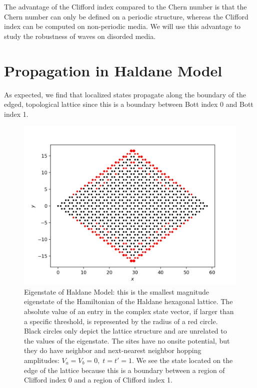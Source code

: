 \documentclass[a4paper]{article}
\begin{document}
The advantage of the Clifford index compared to the Chern number is that the Chern number can only be defined on a periodic structure, whereas the Clifford index can be computed on non-periodic media.
We will use this advantage to study the robustness of waves on disorded media.

\section{Propagation in Haldane Model}
As expected, we find that localized states propagate along the boundary of the edged, topological lattice since this is a boundary between Bott index 0 and Bott index 1.

\begin{figure}
\centering
\includegraphics[width=.5\textwidth]{figures/haldane_estate.png}
\caption{Eigenstate of Haldane Model: this is the smallest magnitude eigenstate of the Hamiltonian of the Haldane hexagonal lattice.
The absolute value of an entry in the complex state vector, if larger than a specific threshold, is represented by the radius of a red circle.
Black circles only depict the lattice structure and are unrelated to the values of the eigenstate.
The sites have no onsite potential, but they do have neighbor and next-nearest neighbor hopping amplitudes: $V_a = V_b = 0,\; t = t' = 1$.
We see the state located on the edge of the lattice because this is a boundary between a region of Clifford index 0 and a region of Clifford index 1.
}
\label{fig:haldane_estate}%
\end{figure}
\end{document}

